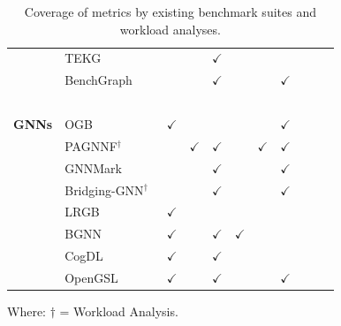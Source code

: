 \begin{landscape}
\begin{table}[htbp]
{\begin{tabular}{ll|cccccccc}
                { ~              }  & { TEKG~\cite{Mcnight2021}           }            &               &              & $\checkmark$  &               &               &               &               &               \\
                { ~              }  & { BenchGraph~\cite{Javor2022,Javor2023}   }      &               &              & $\checkmark$  &               &               & $\checkmark$  &               &               \\
                { ~              }  & { ~                                       }      &   ~           &       ~      &       ~       &       ~       &       ~       &       ~       &       ~       &      ~        \\
                { \textbf{\ac{GNN}s}  }  & { OGB~\cite{Hu2020}                       }      & $\checkmark$  &              &               &               &               & $\checkmark$  &               &               \\
                { ~              }  & { PAGNNF${^\dagger}$~\cite{Wu2021a}          }   &               & $\checkmark$ & $\checkmark$  &               & $\checkmark$  & $\checkmark$  &               &               \\
                { ~              }  & { GNNMark~\cite{Baruah2021}               }      &               &              & $\checkmark$  &               &               & $\checkmark$  &               &               \\
                { ~              }  & { Bridging-GNN$^{\dagger}$~\cite{Huang2021}  }   &               &              & $\checkmark$  &               &               & $\checkmark$  &               &               \\
                { ~              }  & { LRGB~\cite{Dwivedi2022}                 }      & $\checkmark$  &              &               &               &               &               &               &               \\
                { ~              }  & { BGNN~\cite{Dwivedi2023}                 }      & $\checkmark$  &              & $\checkmark$  & $\checkmark$  &               &               &               &               \\
                { ~              }  & { CogDL~\cite{Cen2023}                    }      & $\checkmark$  &              & $\checkmark$  &               &               &               &               &               \\
                { ~              }  & { OpenGSL~\cite{Zhou2024}               }        & $\checkmark$  &              & $\checkmark$  &               &               & $\checkmark$  &               &               \\
            \end{tabular}
            \caption{Coverage of \gai metrics by existing benchmark suites and workload analyses.}
            \label{Table:benchmark-metrics}
        }
    \end{table}
    {   
        \noindent
        \scriptsize
        Where: 
        \textbf{$\dagger$} = Workload Analysis.
    }
\end{landscape}


